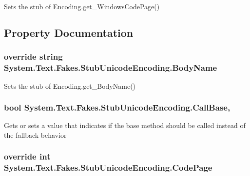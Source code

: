 Sets the stub of Encoding.\-get\-\_\-\-Windows\-Code\-Page()



\subsection{Property Documentation}
\hypertarget{class_system_1_1_text_1_1_fakes_1_1_stub_unicode_encoding_a0e400ab3685fa33749c119fb5c69c8c7}{
\subsubsection[{Body\-Name}]{\setlength{\rightskip}{0pt plus 5cm}override string System.\-Text.\-Fakes.\-Stub\-Unicode\-Encoding.\-Body\-Name\hspace{0.3cm}{\ttfamily [get]}}}\label{class_system_1_1_text_1_1_fakes_1_1_stub_unicode_encoding_a0e400ab3685fa33749c119fb5c69c8c7}


Sets the stub of Encoding.\-get\-\_\-\-Body\-Name()

\hypertarget{class_system_1_1_text_1_1_fakes_1_1_stub_unicode_encoding_aab8338befbb94f81e78572ed38c3a879}{
\subsubsection[{Call\-Base}]{\setlength{\rightskip}{0pt plus 5cm}bool System.\-Text.\-Fakes.\-Stub\-Unicode\-Encoding.\-Call\-Base\hspace{0.3cm}{\ttfamily [get]}, {\ttfamily [set]}}}\label{class_system_1_1_text_1_1_fakes_1_1_stub_unicode_encoding_aab8338befbb94f81e78572ed38c3a879}


Gets or sets a value that indicates if the base method should be called instead of the fallback behavior

\hypertarget{class_system_1_1_text_1_1_fakes_1_1_stub_unicode_encoding_a567951ad474e777b0511cc63710e8609}{
\subsubsection[{Code\-Page}]{\setlength{\rightskip}{0pt plus 5cm}override int System.\-Text.\-Fakes.\-Stub\-Unicode\-Encoding.\-Code\-Page\hspace{0.3cm}{\ttfamily [get]}}}\label{class_system_1_1_text_1_1_fakes_1_1_stub_unicode_encoding_a567951ad474e777b0511cc63710e8609}



